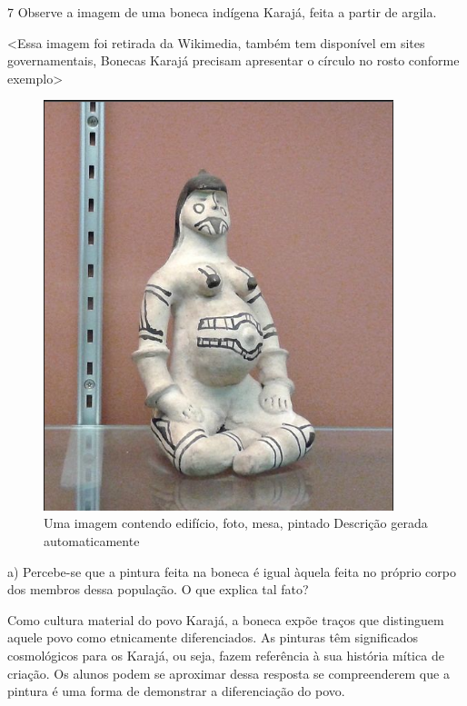
\num{7} Observe a imagem de uma boneca indígena Karajá, feita a partir
de argila.

\textless{}Essa imagem foi retirada da Wikimedia, também tem disponível
em sites governamentais, Bonecas Karajá precisam apresentar o círculo no
rosto conforme exemplo\textgreater{}

\begin{figure}
\centering
\includegraphics[width=4.00813in,height=4.70245in]{./imgSAEB_9_CHUM3/media/image1.png}
\caption{Uma imagem contendo edifício, foto, mesa, pintado Descrição
gerada automaticamente}
\end{figure}

a) Percebe-se que a pintura feita na boneca é igual àquela feita no
próprio corpo dos membros dessa população. O que explica tal fato?

Como cultura material do povo Karajá, a boneca expõe traços que
distinguem aquele povo como etnicamente diferenciados. As pinturas têm
significados cosmológicos para os Karajá, ou seja, fazem referência à
sua história mítica de criação. Os alunos podem se aproximar dessa
resposta se compreenderem que a pintura é uma forma de demonstrar a
diferenciação do povo.

